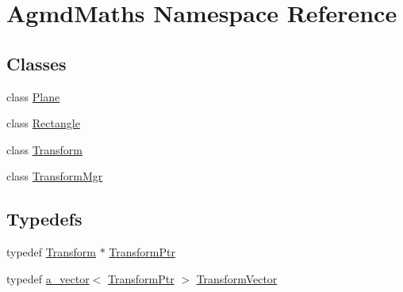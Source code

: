 \hypertarget{namespace_agmd_maths}{\section{Agmd\+Maths Namespace Reference}
\label{namespace_agmd_maths}
}
\subsection*{Classes}
\begin{DoxyCompactItemize}
\item 
class \hyperlink{class_agmd_maths_1_1_plane}{Plane}
\item 
class \hyperlink{class_agmd_maths_1_1_rectangle}{Rectangle}
\item 
class \hyperlink{class_agmd_maths_1_1_transform}{Transform}
\item 
class \hyperlink{class_agmd_maths_1_1_transform_mgr}{Transform\+Mgr}
\end{DoxyCompactItemize}
\subsection*{Typedefs}
\begin{DoxyCompactItemize}
\item 
typedef \hyperlink{class_agmd_maths_1_1_transform}{Transform} $\ast$ \hyperlink{namespace_agmd_maths_a5f0367fe1d910e5b7bf2f4b657f33aff}{Transform\+Ptr}
\item 
typedef \hyperlink{_vector_8h_a3df82cea60ff4ad0acb44e58454406a5}{a\+\_\+vector}$<$ \hyperlink{namespace_agmd_maths_a5f0367fe1d910e5b7bf2f4b657f33aff}{Transform\+Ptr} $>$ \hyperlink{namespace_agmd_maths_a4574846b921ff329a31770fd826ba896}{Transform\+Vector}
\end{DoxyCompactItemize}
